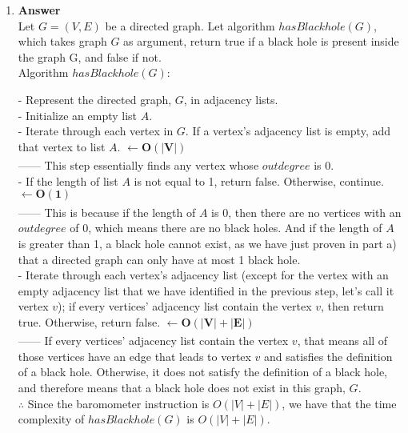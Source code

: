 \documentclass[12pt]{book}
\begin{document}
\begin{enumerate}
\begin{enumerate}
        \item \textbf{Answer}\\
        
        Let $G = (V,E)$ be a directed graph. Let algorithm $hasBlackhole(G)$, which takes graph $G$ as argument, return true if a black hole is present inside the graph G, and false if not.\\
        
        Algorithm $hasBlackhole(G)$:
        
        - Represent the directed graph, $G$, in adjacency lists.\\
        - Initialize an empty list $A$.\\
        - Iterate through each vertex in $G$. If a vertex's adjacency list is empty, add that vertex to list $A$. \qquad $\xleftarrow[]{} \boldsymbol{O(|V|)}$\\
        ------ This step essentially finds any vertex whose $outdegree$ is 0.\\
        - If the length of list $A$ is not equal to 1, return false. Otherwise, continue. \qquad $\xleftarrow[]{} \boldsymbol{O(1)}$\\
        ------ This is because if the length of $A$ is 0, then there are no vertices with an $outdegree$ of 0, which means there are no black holes. And if the length of $A$ is greater than 1, a black hole cannot exist, as we have just proven in part a) that a directed graph can only have at most 1 black hole.\\
        - Iterate through each vertex's adjacency list (except for the vertex with an empty adjacency list that we have identified in the previous step, let's call it vertex $v$); if every vertices' adjacency list contain the vertex $v$, then return true. Otherwise, return false. \qquad $\xleftarrow[]{} \boldsymbol{O(|V| + |E|)}$\\
        ------ If every vertices' adjacency list contain the vertex $v$, that means all of those vertices have an edge that leads to vertex $v$ and satisfies the definition of a black hole. Otherwise, it does not satisfy the definition of a black hole, and therefore means that a black hole does not exist in this graph, $G$.\\
        
        $\therefore$ Since the baromometer instruction is $O(|V|+|E|)$, we have that the time complexity of $hasBlackhole(G)$ is $O(|V|+|E|)$.
        
        
    \end{enumerate}
    
\end{enumerate}
\end{document}
